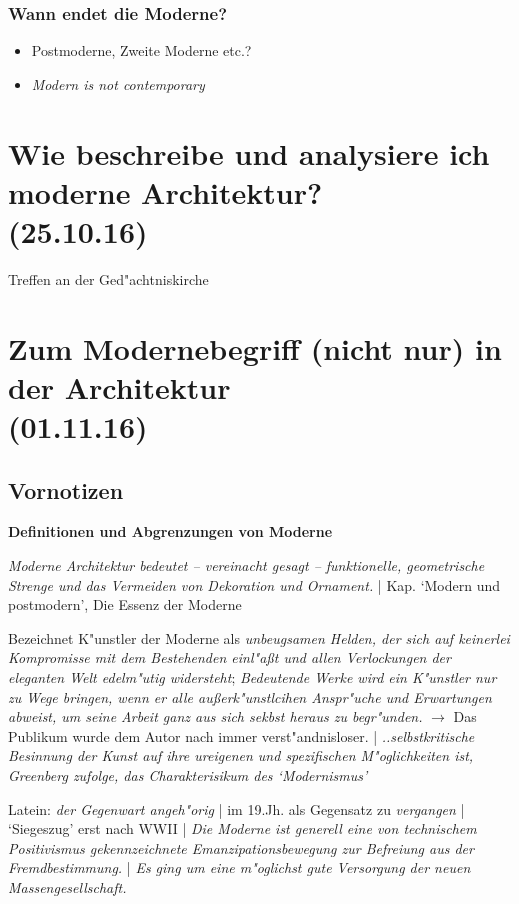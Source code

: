 \documentclass[a5paper]{scrartcl}
\begin{document}
\subsubsection{Wann endet die Moderne?}

\begin{itemize}
    \item Postmoderne, Zweite Moderne etc.?
    \item \emph{Modern is not contemporary}
\end{itemize}

\section{Wie beschreibe und analysiere ich moderne Architektur?\\(25.10.16)}

Treffen an der Ged"achtniskirche


\section{Zum Modernebegriff (nicht nur) in der Architektur\\(01.11.16)}

\subsection{Vornotizen}
\textbf{Definitionen und Abgrenzungen von Moderne}

\begin{description}[leftmargin=!,labelwidth=\widthof{\bfseries P2}]
  \item[Greenberg (Arch.)] \emph{Moderne Architektur bedeutet -- vereinacht gesagt -- funktionelle, geometrische Strenge und das Vermeiden von Dekoration und Ornament.} | Kap. `Modern und postmodern', Die Essenz der Moderne 
  \item[Greenberg (Kunst)] Bezeichnet K"unstler der Moderne als \emph{unbeugsamen Helden, der sich auf keinerlei Kompromisse mit dem Bestehenden einl"a\ss t und allen Verlockungen der eleganten Welt edelm"utig widersteht}; \emph{Bedeutende Werke wird ein K"unstler nur zu Wege bringen, wenn er alle au\ss erk"unstlcihen Anspr"uche und Erwartungen abweist, um seine Arbeit ganz aus sich sekbst heraus zu begr"unden.} $\rightarrow$ Das Publikum wurde dem Autor nach immer verst"andnisloser. | \emph{..selbstkritische Besinnung der Kunst auf ihre ureigenen und spezifischen M"oglichkeiten ist, Greenberg zufolge, das Charakterisikum des `Modernismus' }
  
  \item[Kretschmer] Latein: \emph{der Gegenwart angeh"orig} | im 19.Jh. als Gegensatz zu \emph{vergangen} | `Siegeszug' erst nach WWII | \emph{Die Moderne ist generell eine von technischem Positivismus gekennzeichnete Emanzipationsbewegung zur Befreiung aus der Fremdbestimmung.} | \emph{Es ging um eine m"oglichst gute Versorgung der neuen Massengesellschaft.} 
\end{description}
\end{document}
